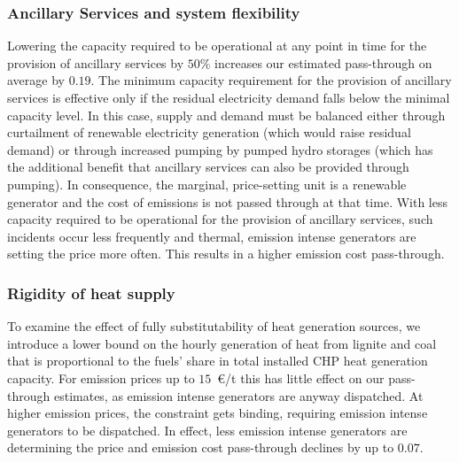 \documentclass[preprint, 12pt, authoryear]{elsarticle}
\begin{document}
\subsubsection*{Ancillary Services and system flexibility} 
Lowering the capacity required to be operational at any point in time for the provision of ancillary services by $50\%$ increases our estimated pass-through on average by $0.19$.
The minimum capacity requirement for the provision of ancillary services is effective only if the residual electricity demand falls below the minimal capacity level.
In this case, supply and demand must be balanced either through curtailment of renewable electricity generation (which would raise residual demand) or through increased pumping by pumped hydro storages (which has the additional benefit that ancillary services can also be provided through pumping).
In consequence, the marginal, price-setting unit is a renewable generator and the cost of  emissions is not passed through at that time.
With less capacity required to be operational for the provision of ancillary services, such incidents occur less frequently and thermal,  emission intense generators are setting the price more often. This results in a higher emission cost pass-through.\subsubsection*{Rigidity of heat supply}
To examine the effect of fully substitutability of heat generation sources, we introduce a lower bound on the hourly generation of heat from lignite and coal that is proportional to the fuels’ share in total installed CHP heat generation capacity.
For emission prices up to $15$~\euro{}/t this has little effect on our pass-through estimates, as emission intense generators are anyway dispatched. 
At higher emission prices, the constraint gets binding, requiring emission intense generators to be dispatched. In effect, less emission intense generators are determining the price and emission cost pass-through declines by up to $0.07$.
\end{document}
